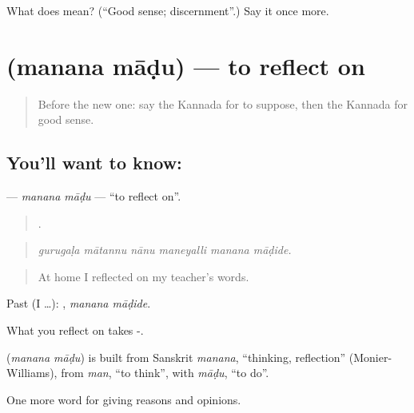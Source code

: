 \begin{tcolorbox}[breakable,colback=teal!4,colframe=teal!35!black,title={Before you move on}]
What does  mean? (\textquotedblleft{}Good sense; discernment\textquotedblright{}.) Say it once more.
\end{tcolorbox}
\section[\texorpdfstring{\kn{ಮನನ} \kn{ಮಾಡು} (manana māḍu)}{ಮನನ ಮಾಡು (manana māḍu)}]{  (manana māḍu) — to reflect on}

\label{lesson:KA-C381-manana-madu}



\begin{quote}
Before the new one: say the Kannada for to suppose, then the Kannada for good sense.
\end{quote}

\subsection*{You'll want to know:  }
\textbf{ } — \emph{manana māḍu} — \textquotedblleft{}to reflect on\textquotedblright{}.

\begin{quote}
     .
\end{quote}

\begin{quote}
\emph{gurugaḷa mātannu nānu maneyalli manana māḍide.}
\end{quote}

\begin{quote}
At home I reflected on my teacher's words.
\end{quote}

Past (I …):  , \emph{manana māḍide}.

What you reflect on takes -.

\begin{cousinweb}
\textbf{ } (\emph{manana māḍu}) is built from Sanskrit \emph{manana}, \textquotedblleft{}thinking, reflection\textquotedblright{} (Monier-Williams), from \emph{man}, \textquotedblleft{}to think\textquotedblright{}, with \emph{māḍu}, \textquotedblleft{}to do\textquotedblright{}.
\end{cousinweb}

\begin{grammarlens}[title={What you've built}]
One more word for giving reasons and opinions.
\end{grammarlens}

